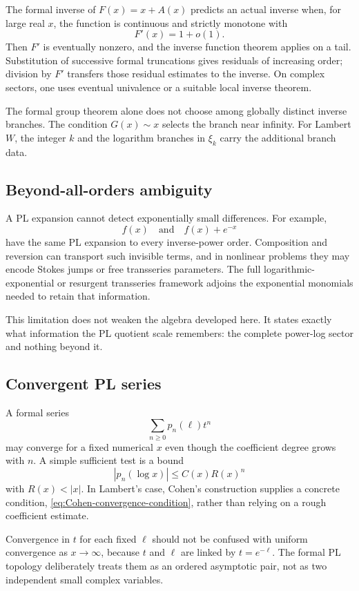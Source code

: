\documentclass[11pt,oneside]{article}
\numberwithin{equation}{section}
\theoremstyle{definition}
\newcommand{\as}{\sim}
\begin{document}
The formal inverse of \(F(x)=x+A(x)\) predicts an actual inverse when, for large
real \(x\), the function is continuous and strictly monotone with
\[
  F'(x)=1+o(1).
\]
Then \(F'\) is eventually nonzero, and the inverse function theorem applies on
a tail.  Substitution of successive formal truncations gives residuals of
increasing order; division by \(F'\) transfers those residual estimates to the
inverse.  On complex sectors, one uses eventual univalence or a suitable local
inverse theorem.

The formal group theorem alone does not choose among globally distinct inverse
branches.  The condition \(G(x)\as x\) selects the branch near infinity.  For
Lambert \(W\), the integer \(k\) and the logarithm branches in \(\xi_k\) carry the
additional branch data.

\subsection{Beyond-all-orders ambiguity}

A PL expansion cannot detect exponentially small differences.  For example,
\[
  f(x)\quad\text{and}\quad f(x)+e^{-x}
\]
have the same PL expansion to every inverse-power order.  Composition and
reversion can transport such invisible terms, and in nonlinear problems they
may encode Stokes jumps or free transseries parameters.  The full
logarithmic-exponential or resurgent transseries framework adjoins the
exponential monomials needed to retain that information.

This limitation does not weaken the algebra developed here.  It states exactly
what information the PL quotient scale remembers: the complete power-log sector
and nothing beyond it.

\subsection{Convergent PL series}

A formal series
\[
  \sum_{n\ge0}p_n(\ell)t^n
\]
may converge for a fixed numerical \(x\) even though the coefficient degree
grows with \(n\).  A simple sufficient test is a bound
\[
  |p_n(\log x)|\le C(x)R(x)^n
\]
with \(R(x)<|x|\).  In Lambert's case, Cohen's construction supplies a concrete
condition, \eqref{eq:Cohen-convergence-condition}, rather than relying on a
rough coefficient estimate.

Convergence in \(t\) for each fixed \(\ell\) should not be confused with
uniform convergence as \(x\to\infty\), because \(t\) and \(\ell\) are linked by
\(t=e^{-\ell}\).  The formal PL topology deliberately treats them as an ordered
asymptotic pair, not as two independent small complex variables.
\end{document}
